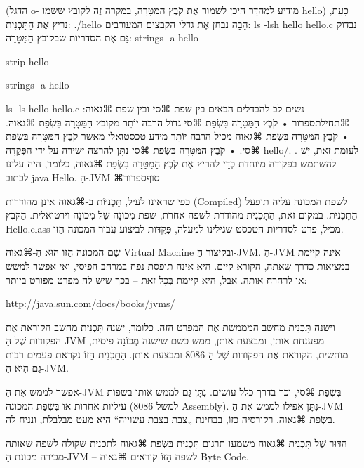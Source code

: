 (הדגל o- מודיע למְהַדֵּר היכן לשמור אֶת קֹבֶץ הַמַּטָּרָה, במקרה זֶה לקובץ ששמו
hello)
כָּעֵת, נריץ אֶת הַתָּכְנִית:
./hello
\END
הָבָה נבחן אֶת גדלי הקבצים המעורבים:
ls -lsh hello hello.c
\END
נבדוק גַּם אֶת הסדריות שבקובץ הַמַּטָּרָה:
strings -a hello
\END

strip hello
\END

strings -a hello
\END

ls -ls hello hello.c
\END
נשים לב להבדלים הבאים בין שפת ⌘סי ובין שפת ⌘גאוה:
⌘תחילת{ספרור}
• קֹבֶץ הַמַּטָּרָה בִּשְׂפַת ⌘סי גדול הרבה יוֹתֵר מקובץ הַמַּטָּרָה בִּשְׂפַת
⌘גאוה.
• קֹבֶץ הַמַּטָּרָה בִּשְׂפַת ⌘גאוה מכיל הרבה יוֹתֵר מידע טכסטואלי מאשר קֹבֶץ
הַמַּטָּרָה בִּשְׂפַת ⌘סי.
• קֹבֶץ הַמַּטָּרָה בִּשְׂפַת ⌘סי נִתָּן להרצה ישירה עַל ידי הַפְּקֻדָּה hello/.
. לעומת זאת, יֵשׁ להשתמש בפקודה מיוחדת כְּדֵי להריץ אֶת קֹבֶץ הַמַּטָּרָה
בִּשְׂפַת ⌘גאוה, כלומר, היה עלינו לכתוב java Hello.
הַ-JVM
⌘סוף{ספרור}

כפי שראינו לעיל, תָּכְנִיּוֹת ב-⌘גאוה אינן מהודרות (Compiled) לשפת המכונה עליה
תופעל הַתָּכְנִית. במקום זאת, הַתָּכְנִית מהודרת לשפה אחרת, שפת מְכוֹנָה שֶׁל
מְכוֹנָה וירטואלית. הַקֹּבֶץ Hello.class מכיל, פרט לסדריות הטכסט שגילינו למעלה,
פְּקֻדּוֹת לביצוע עֲבוּר המכונה הַזּוֹ.

שֵׁם המכונה הַזּוֹ הוּא הַ-⌘גאוה Virtual Machine ובקיצור הַ-JVM. הַ-JVM אינה
קיימת במציאות כדרך שאתה, הקורא קיים. הִיא אינה תופסת נפח במרחב הפיסי, ואי אפשר
למשש או לרחרח אותה. אבל, הִיא קיימת בְּכָל זאת – בכך שיש לה מפרט מפורט ביותר:
\begin{english}
\url{http://java.sun.com/docs/books/jvms/}
\end{english}

וישנה תָּכְנִית מחשב הַמממשת אֶת המפרט הזה. כלומר, ישנה תָּכְנִית מחשב הקוראת
אֶת הפקודות שֶׁל הַ-JVM מפענחת אותן, ומבצעת אותן, ממש כשם שישנה מְכוֹנָה פיסית,
מוחשית, הקוראת אֶת הפקודות שֶׁל הַ-8086 ומבצעת אותן. הַתָּכְנִית הַזּוֹ נקראת
פעמים רבות גַּם הִיא הַ-JVM.

אפשר לממש אֶת הַ-JVM בִּשְׂפַת ⌘סי, וכך בדרך כלל עושים. נִתָּן גַּם לממש אותו
בשפות עיליות אחרות או בִּשְׂפַת המכונה (למשל 8086 Assembly). נִתָּן אפילו לממש
אֶת הַ-JVM בִּשְׂפַת ⌘גאוה. רקורסיה כזוֹ, בבחינת „צבת בצבת עשוייה“ הִיא מעט
מבלבלת, ונניח לה.

הִדּוּר שֶׁל תָּכְנִית ⌘גאוה משמעו תרגום תָּכְנִית בִּשְׂפַת ⌘גאוה לתכנית שקולה
לשפה שאותה מכירה מכונת הַ-JVM – לשפה הַזּוֹ קוראים ⌘גאוה Byte Code.

